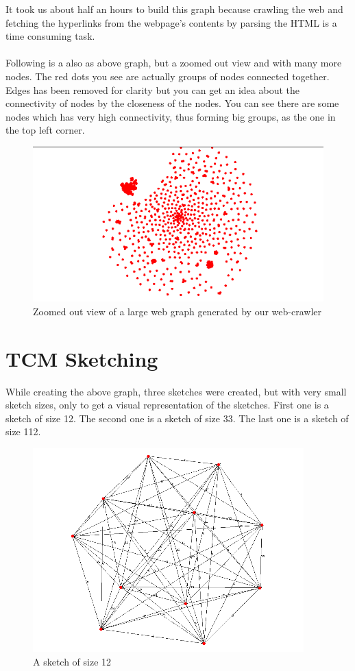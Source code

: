 \documentclass[12pt]{report}
\numberwithin{figure}{section}
\numberwithin{table}{section}
\begin{document}
It took us about half an hours to build this graph because crawling the web and fetching the hyperlinks from the webpage’s contents by parsing the HTML is a time consuming task. 

\paragraph{}

Following is a also as above graph, but a zoomed out view and with many more nodes. The red dots you see are actually groups of nodes connected together. Edges has been removed for clarity but you can get an idea about the connectivity of nodes by the closeness of the nodes. You can see there are some nodes which has very high connectivity, thus forming big groups, as the one in the top left corner. 

\begin{figure}[H]
\centering
\includegraphics[scale=0.8]{images/graph2}
\caption[Zoomed out view of a large web graph]{Zoomed out view of a large web graph generated by our web-crawler}
\end{figure}

\section{TCM Sketching}
While creating the above graph, three sketches were created, but with very small sketch sizes, only to get a visual representation of the sketches. First one is a sketch of size 12. The second one is a sketch of size 33. The last one is a sketch of size 112.


\begin{figure}[H]
\centering
\includegraphics[scale=0.8]{images/s1}
\caption{A sketch of size 12}
\end{figure}
\end{document}

